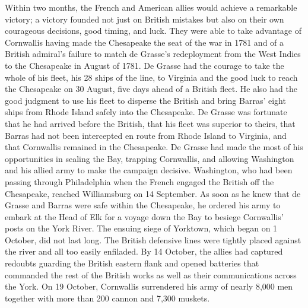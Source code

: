 Within two months, the French and American allies would achieve a remarkable victory;
a victory founded not just on British mistakes but also on their own courageous decisions,
good timing, and luck. They were able to take advantage of Cornwallis having made the
Chesapeake the seat of the war in 1781 and of a British admiral's failure to match de
Grasse's redeployment from the West Indies to the Chesapeake in August of 1781. De
Grasse had the courage to take the whole of his fleet, his 28 ships of the line, to Virginia
and the good luck to reach the Chesapeake on 30 August, five days ahead of a British fleet.
He also had the good judgment to use his fleet to disperse the British and bring Barras'
eight ships from Rhode Island safely into the Chesapeake. De Grasse was fortunate that he
had arrived before the British, that his fleet was superior to theirs, that Barras had not been
intercepted en route from Rhode Island to Virginia, and that Cornwallis remained in the
Chesapeake. De Grasse had made the most of his opportunities in sealing the Bay, trapping
Cornwallis, and allowing Washington and his allied army to make the campaign decisive.
Washington, who had been passing through Philadelphia when the French engaged the
British off the Chesapeake, reached Williamsburg on 14 September. As soon as he knew
that de Grasse and Barras were safe within the Chesapeake, he ordered his army to embark
at the Head of Elk for a voyage down the Bay to besiege Cornwallis' posts on the York
River. The ensuing siege of Yorktown, which began on 1 October, did not last long. The
British defensive lines were tightly placed against the river and all too easily enfiladed. By
14 October, the allies had captured redoubts guarding the British eastern flank and opened
batteries that commanded the rest of the British works as well as their communications
across the York. On 19 October, Cornwallis surrendered his army of nearly 8,000 men
together with more than 200 cannon and 7,300 muskets.

